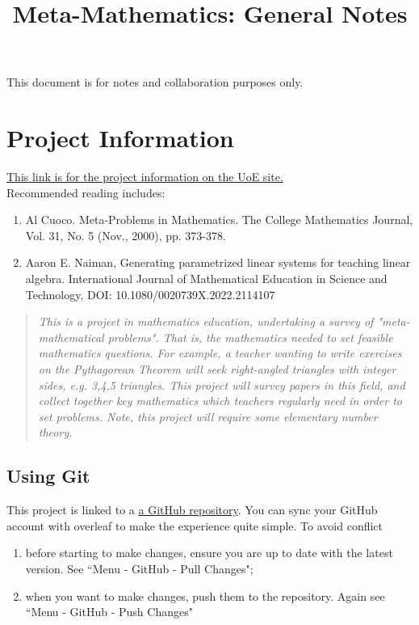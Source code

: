 \documentclass[12pt]{article}
\title{Meta-Mathematics: General Notes}
\author{}
\date{}
\begin{document}
\maketitle

\tableofcontents
\vspace{1cm}
{\Large This document is for notes and collaboration purposes only.}
\pagebreak

\section{Project Information}
\href{https://webapps.maths.ed.ac.uk/student_choices/project_info.php?id=UG1429}{This link is for the project information on the UoE site.}\\
Recommended reading includes:
\begin{enumerate}
    \item Al Cuoco. Meta-Problems in Mathematics. The College Mathematics Journal, Vol. 31, No. 5 (Nov., 2000), pp. 373-378.
    \item Aaron E. Naiman, Generating parametrized linear systems for teaching linear algebra. International Journal of Mathematical Education in Science and Technology, DOI: 10.1080/0020739X.2022.2114107
\end{enumerate}

\begin{quote}
    \textit{This is a project in mathematics education, undertaking a survey of "meta-mathematical problems". That is, the mathematics needed to set feasible mathematics questions. For example, a teacher wanting to write exercises on the Pythagorean Theorem will seek right-angled triangles with integer sides, e.g. 3,4,5 triangles. This project will survey papers in this field, and collect together key mathematics which teachers regularly need in order to set problems. Note, this project will require some elementary number theory.}
\end{quote}

\subsection{Using Git}
This project is linked to a \href{https://github.com/freddickinsonuoe/Meta-Mathematics}{a GitHub repository}. You can sync your GitHub account with overleaf to make the experience quite simple. To avoid conflict
\begin{enumerate}[itemsep=-2mm]
    \item before starting to make changes, ensure you are up to date with the latest version. See ``Menu - GitHub - Pull Changes";
    \item when you want to make changes, push them to the repository. Again see ``Menu - GitHub - Push Changes"
\end{enumerate}
\end{document}
